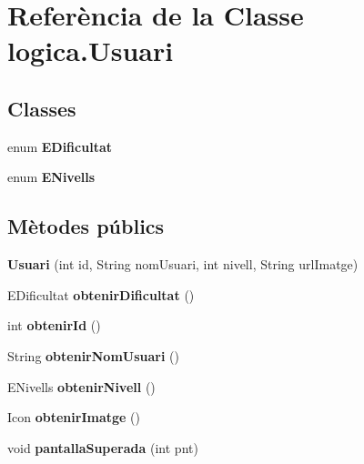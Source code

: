 \hypertarget{classlogica_1_1_usuari}{\section{Referència de la Classe logica.\+Usuari}
\label{classlogica_1_1_usuari}
}
\subsection*{Classes}
\begin{DoxyCompactItemize}
\item 
enum {\bfseries E\+Dificultat}
\item 
enum {\bfseries E\+Nivells}
\end{DoxyCompactItemize}
\subsection*{Mètodes públics}
\begin{DoxyCompactItemize}
\item 
\hypertarget{classlogica_1_1_usuari_a7d61fbf17076f5c75841d30598ee3289}{{\bfseries Usuari} (int id, String nom\+Usuari, int nivell, String url\+Imatge)}\label{classlogica_1_1_usuari_a7d61fbf17076f5c75841d30598ee3289}

\item 
\hypertarget{classlogica_1_1_usuari_a8aaddefb9f6dba6e142426483ade785f}{E\+Dificultat {\bfseries obtenir\+Dificultat} ()}\label{classlogica_1_1_usuari_a8aaddefb9f6dba6e142426483ade785f}

\item 
\hypertarget{classlogica_1_1_usuari_a47de68f8f3a0a5c45352b0f93cb0d156}{int {\bfseries obtenir\+Id} ()}\label{classlogica_1_1_usuari_a47de68f8f3a0a5c45352b0f93cb0d156}

\item 
\hypertarget{classlogica_1_1_usuari_a642304fd209679e1cd3f312eaa06ed9c}{String {\bfseries obtenir\+Nom\+Usuari} ()}\label{classlogica_1_1_usuari_a642304fd209679e1cd3f312eaa06ed9c}

\item 
\hypertarget{classlogica_1_1_usuari_a1af8cdd311f23f556295912d869c1630}{E\+Nivells {\bfseries obtenir\+Nivell} ()}\label{classlogica_1_1_usuari_a1af8cdd311f23f556295912d869c1630}

\item 
\hypertarget{classlogica_1_1_usuari_aa1f96063a4d6a068e2088e6f7339a4fa}{Icon {\bfseries obtenir\+Imatge} ()}\label{classlogica_1_1_usuari_aa1f96063a4d6a068e2088e6f7339a4fa}

\item 
\hypertarget{classlogica_1_1_usuari_a3d2c12a1138df467863c3ff43827bed1}{void {\bfseries pantalla\+Superada} (int pnt)}\label{classlogica_1_1_usuari_a3d2c12a1138df467863c3ff43827bed1}

\end{DoxyCompactItemize}


